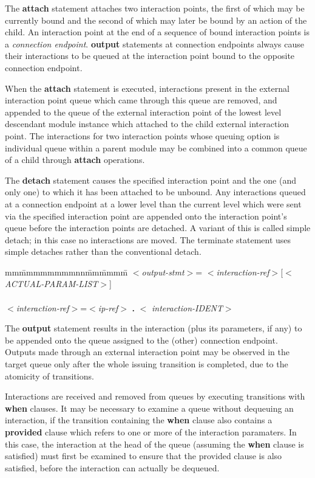 The {\bf attach} statement attaches two interaction points, the
first of which may be currently bound and the second of
which may later be bound by an action of the child. An
interaction point at the end of a sequence of bound
interaction points is a {\em connection endpoint}. {\bf output}
statements at connection endpoints always cause their
interactions to be queued at the interaction point bound to
the opposite connection endpoint.
 
When the {\bf attach} statement is executed, interactions
present in the external interaction point queue which came
through this queue are removed, and appended to the queue of
the external interaction point of the lowest level
descendant module instance which attached to the child
external interaction point. The interactions for two
interaction points whose queuing option is individual queue
within a parent module may be combined into a common queue
of a child through {\bf attach} operations.
 
The {\bf detach} statement causes the specified interaction
point and the one (and only one) to which it has been
attached to be unbound. Any interactions queued at a
connection endpoint at a lower level than the current level
which were sent via the specified interaction point are
appended onto the interaction point's queue before the
interaction points are detached. A variant of this is called
simple detach; in this case no interactions are moved. The
terminate statement uses simple detaches rather than the
conventional detach.

\begin{tabbing}
mm\=mmmmmmmmnn\=mm\=mmmm\=\+\kill
$<${\em output-stmt}$>$\>= $<${\em interaction-ref}$>$[$<${\em
ACTUAL-PARAM-LIST}$>$]\\
\mbox{}\\
$<${\em interaction-ref}$>$\>=\>$<${\em ip-ref}$>$ {\bf .} $<${\em
interaction-IDENT}$>$\\
\end{tabbing}

The {\bf output} statement results in the interaction (plus its
parameters, if any) to be appended onto the queue assigned
to the (other) connection endpoint. Outputs made through an
external interaction point may be observed in the target
queue only after the whole issuing transition is completed,
due to the atomicity of transitions.

Interactions are received and removed from queues by
executing transitions with {\bf when} clauses. It may be necessary
to examine a queue without dequeuing an interaction, if the
transition containing the {\bf when} clause also contains a
{\bf provided} clause which refers to one or more of the
interaction paramaters. In this case, the interaction at the
head of the queue (assuming the {\bf when} clause is satisfied)
must first be examined to ensure that the provided clause is
also satisfied, before the interaction can actually be
dequeued.


